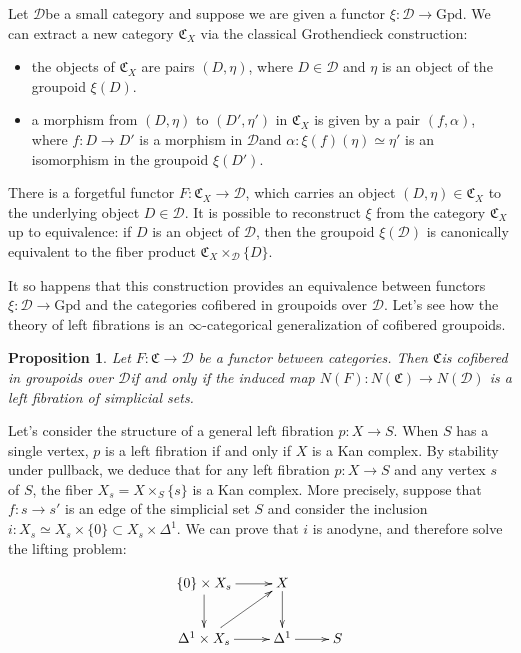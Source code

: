 \documentclass[12pt]{amsart}
\newcommand{\8}{\ensuremath{\infty}}
\newcommand{\C}{\ensuremath{\mathfrak{C}}}
\newcommand{\D}{\ensuremath{\mathscr{D}}}
\newcommand{\Pt}[1]{\ensuremath{\{{#1}\}}}
\newcommand{\Gpd}{\ensuremath{\text{Gpd}}}
\newtheorem{proposition}{Proposition}
\begin{document}
Let \D be a small category and suppose we are given a functor $\xi: \D \rightarrow \Gpd$. We can extract a new category $\C_X$ via the classical Grothendieck construction:

\begin{itemize}
  \item the objects of $\C_X$ are pairs $(D, \eta)$, where $D \in \D$ and $\eta$ is an object of the groupoid $\xi(D)$.
  \item a morphism from $(D, \eta)$ to $(D', \eta')$ in $\C_X$ is given by a pair $(f, \alpha)$, where $f : D \rightarrow D'$ is a morphism in \D and $\alpha : \xi(f)(\eta) \simeq \eta'$ is an isomorphism in the groupoid $\xi(D')$.
\end{itemize}

There is a forgetful functor $F: \C_X \rightarrow \D$, which carries an object $(D, \eta) \in \C_X$ to the underlying object $D \in \D$. It is possible to reconstruct $\xi$ from the category $\C_X$ up to equivalence: if $D$ is an object of \D, then the groupoid $\xi(\D)$ is canonically equivalent to the fiber product $\C_X \times_\D \Pt{D}$.

It so happens that this construction provides an equivalence between functors $\xi : \D \rightarrow \Gpd$ and the categories cofibered in groupoids over \D. Let's see how the theory of left fibrations is an \8-categorical generalization of cofibered groupoids.

\begin{proposition}
  Let $F: \C \rightarrow\D$ be a functor between categories. Then \C is cofibered in groupoids over \D  if and only if the induced map $N(F): N(\C) \rightarrow N(\D)$ is a left fibration of simplicial sets.
\end{proposition}

Let's consider the structure of a general left fibration $p: X \rightarrow S$. When $S$ has a single vertex, $p$ is a left fibration if and only if $X$ is a Kan complex. By stability under pullback, we deduce that for any left fibration $p: X \rightarrow S$ and any vertex $s$ of $S$, the fiber $X_s = X\times_S\{s\}$ is a Kan complex. More precisely, suppose that $f: s \rightarrow s'$ is an edge of the simplicial set $S$
and consider the inclusion $i: X_s\simeq X_s\times\{0\} \subset X_s\times \Delta^1$. We can prove that $i$ is anodyne, and therefore solve the lifting problem:

$$
  \begin{xy}
    \xymatrix{
      \{0\}\times X_s\ar[r]\ar[d] & X \ar[d] &\\
      \Delta^1\times X_s\ar[r]\ar[ur] & \Delta^1\ar[r] & S
    }
  \end{xy}
$$
\end{document}

